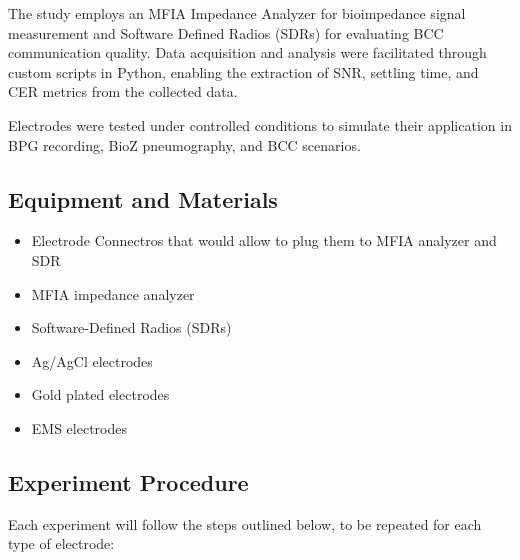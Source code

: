 \documentclass[conference]{IEEEtran}
\begin{document}
The study employs an MFIA Impedance Analyzer for bioimpedance signal measurement and Software Defined Radios (SDRs) for evaluating \gls{BCC} communication quality. Data acquisition and analysis were facilitated through custom scripts in Python, enabling the extraction of SNR, settling time, and \gls{CER} metrics from the collected data.

Electrodes were tested under controlled conditions to simulate their application in BPG recording, \gls{BioZ}   pneumography, and \gls{BCC} scenarios.

\subsection{Equipment and Materials}
\begin{itemize}
    \item Electrode Connectros that would allow to plug them to MFIA analyzer and SDR
    \item MFIA impedance analyzer
    \item Software-Defined Radios (SDRs)
    \item Ag/AgCl electrodes
    \item Gold plated electrodes
    \item EMS electrodes
\end{itemize}

\subsection{Experiment Procedure}
Each experiment will follow the steps outlined below, to be repeated for each type of electrode:
\end{document}
